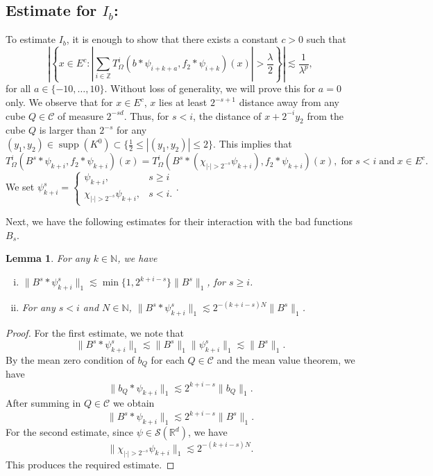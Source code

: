 \documentclass[a4paper,reqno]{amsart}
\newcommand{\R}{{\mathbb R}}       %
\newcommand{\N}{{\mathbb N}}
\newcommand{\Z}{{\mathbb Z}}
\newcommand{\supp}[1]{\operatorname{supp}(#1)}   %
\newtheorem{lemma}[theorem]{Lemma}
\theoremstyle{definition}
\numberwithin{equation}{section}
\begin{document}
	\subsection*{Estimate for $I_b$:} To estimate $I_b$, it is enough to show that there exists a constant $c>0$ such that
	\[\left|\left\{x\in E^c:|\sum_{i\in\Z}T^i_\Omega(b*\psi_{i+k+a},f_2*\psi_{i+k})(x)|>\frac{\lambda}{2}\right\}\right|\lesssim \frac{1}{\lambda^p},\]
	for all $a\in\{-10,\dots,10\}$. Without loss of generality, we will prove this for $a=0$ only. We observe that for $x\in E^c$, $x$ lies at least $2^{-s+1}$ distance away from any cube $Q\in\mathcal{C}$ of measure $2^{-sd}$. Thus, for $s<i$, the distance of $x+2^{-i}y_2$ from the cube $Q$ is larger than $2^{-s}$ for any $(y_1,y_2)\in\supp{K^0}\subset\{\frac{1}{2}\leq|(y_1,y_2)|\leq2\}$. This implies that
	\[T_\Omega^i\left(B^{s}*\psi_{k+i},f_2*\psi_{k+i}\right)(x)=T_\Omega^i\left(B^{s}*(\chi_{|\cdot|>2^{-s}}\psi_{k+i}),f_2*\psi_{k+i}\right)(x),\;\text{for}\;s<i\;\text{and}\;x\in E^c.\]
	We set $\psi_{k+i}^s=\begin{cases}
	\psi_{k+i}, &s\geq i\\ \chi_{|\cdot|>2^{-s}}\psi_{k+i}, &s<i.
	\end{cases}$. 
	
	Next, we have the following estimates for their interaction with the bad functions $B_s$.
	\begin{lemma}\label{lemma:badterm}
		For any $k\in\N$, we have
		\begin{enumerate}[i)]
			\item $\|B^{s}*\psi_{k+i}^s\|_{1}\lesssim\min\{1,2^{k+i-s}\}\|B^{s}\|_{1}$, for $s\geq i$.
			\item For any $s<i$ and $N\in\N$, $\|B^{s}*\psi_{k+i}^s\|_{1}\lesssim 2^{-(k+i-s)N}\|B^{s}\|_{1}$.
		\end{enumerate}
	\end{lemma}
	\begin{proof}
		For the first estimate, we note that \[\|B^{s}*\psi_{k+i}^s\|_{1}\lesssim\|B^{s}\|_{1}\|\psi_{k+i}^s\|_1\lesssim\|B^{s}\|_{1}.\] By the mean zero condition of $b_{Q}$ for each $Q\in\mathcal{C}$ and the mean value theorem, we have
		\[\|b_{Q}*\psi_{k+i}\|_1\lesssim 2^{k+i-s}\|b_{Q}\|_{1}.\]
		After summing in $Q\in\mathcal{C}$ we obtain
		\[\|B^{s}*\psi_{k+i}\|_{1}\lesssim2^{k+i-s}\|B^{s}\|_{1}.\]
		For the second estimate,  since $\psi\in\mathcal{S}(\R^d)$, we have
		\[\|\chi_{|\cdot|>2^{-s}}\psi_{k+i}\|_1\lesssim2^{-(k+i-s)N}.\]
		This produces the required estimate.
\end{proof}
\end{document}
